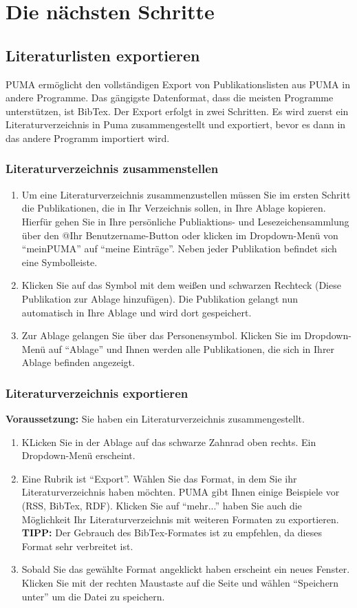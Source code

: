 \documentclass[a4paper,11pt,twoside]{scrbook}
\begin{document}
\section{Die nächsten Schritte}
\subsection{Literaturlisten exportieren}
PUMA ermöglicht den vollständigen Export von Publikationslisten aus PUMA in andere Programme. Das gängigste Datenformat, dass die meisten Programme unterstützen, ist BibTex. \newline 
Der Export erfolgt in zwei Schritten. Es wird zuerst ein Literaturverzeichnis in Puma zusammengestellt und exportiert, bevor es dann in das andere Programm importiert wird.
\subsubsection{Literaturverzeichnis zusammenstellen}
\begin{enumerate}
    \item Um eine Literaturverzeichnis zusammenzustellen müssen Sie im ersten Schritt die Publikationen, die in Ihr Verzeichnis sollen, in Ihre Ablage kopieren. Hierfür gehen Sie in Ihre persönliche Publiaktions- und Lesezeichensammlung über den @Ihr Benutzername-Button oder klicken im Dropdown-Menü von \enquote{meinPUMA} auf \enquote{meine Einträge}.  Neben jeder Publikation befindet sich eine Symbolleiste.
    \item Klicken Sie auf das Symbol mit dem weißen und schwarzen Rechteck (Diese Publikation zur Ablage hinzufügen). Die Publikation gelangt nun automatisch in Ihre Ablage und wird dort gespeichert.
    \item Zur Ablage gelangen Sie über das Personensymbol. Klicken Sie im Dropdown-Menü auf \enquote{Ablage} und Ihnen werden alle Publikationen, die sich in Ihrer Ablage befinden angezeigt. 
\end{enumerate}
\subsubsection{Literaturverzeichnis exportieren}
\textbf{Voraussetzung:} Sie haben ein Literaturverzeichnis zusammengestellt.
\begin{enumerate}
    \item KLicken Sie in der Ablage auf das schwarze Zahnrad oben rechts. Ein Dropdown-Menü erscheint.
    \item Eine Rubrik ist \enquote{Export}. Wählen Sie das Format, in dem Sie ihr Literaturverzeichnis haben möchten. PUMA gibt Ihnen einige Beispiele vor (RSS, BibTex, RDF). Klicken Sie auf \enquote{mehr...} haben Sie auch die Möglichkeit Ihr Literaturverzeichnis mit weiteren Formaten zu exportieren. \textbf{TIPP:} Der Gebrauch des BibTex-Formates ist zu empfehlen, da dieses Format sehr verbreitet ist.
    \item Sobald Sie das gewählte Format angeklickt haben erscheint ein neues Fenster. Klicken Sie mit der rechten Maustaste auf die Seite und wählen \enquote{Speichern unter} um die Datei zu speichern.
\end{enumerate}
\end{document}
